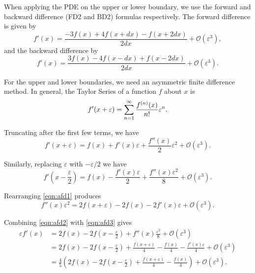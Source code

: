 When applying the PDE on the upper or lower boundary, we use the forward and backward difference (FD2 and BD2) formulas respectively.
The forward difference is given by
\begin{equation*}
    \label{eq:FD2}
    f'(x) = \frac{-3f(x)+4f(x+dx)-f(x+2dx)}{2dx} + \mathcal{O}(\varepsilon^3),
\end{equation*}
and the backward difference by
\begin{equation*}
    \label{eq:BD2}
    f'(x) = \frac{3f(x)-4f(x-dx)+f(x-2dx)}{2dx} + \mathcal{O}(\varepsilon^3).
\end{equation*}

For the upper and lower boundaries, we need an asymmetric finite difference
method.
In general, the Taylor Series of a function $f$ about $x$ is
\begin{equation*}
  f'(x+\varepsilon) = \sum_{n=1}^\infty \frac{f^{(n)}(x)}{n!} \varepsilon^n. \\
\end{equation*}

Truncating after the first few terms, we have
\begin{equation}
  \label{eqn:afd1}
  f'(x+\varepsilon)  = f(x) + f'(x)\varepsilon + \frac{f''(x)}{2}\varepsilon^2 + \mathcal{O}(\varepsilon^3).
\end{equation}

Similarly, replacing $\varepsilon$ with $-\varepsilon/2$ we have
\begin{equation}
  \label{eqn:afd2}
  f'(x-\frac{\varepsilon}{2}) = f(x) - \frac{f'(x)\varepsilon}{2} + \frac{f''(x)\varepsilon^2}{8} + \mathcal{O}(\varepsilon^3).
\end{equation}

Rearranging \eqref{eqn:afd1} produces
\begin{equation}
  \label{eqn:afd3}
  f''(x)\varepsilon^2 = 2f(x+\varepsilon) - 2f(x) - 2f'(x)\varepsilon + \mathcal{O}(\varepsilon^3).
\end{equation}

Combining \eqref{eqn:afd2} with \eqref{eqn:afd3} gives
\begin{align*}
  \varepsilon f'(x) &= 2f(x) - 2f(x-\frac{\varepsilon}{2}) + f''(x)\frac{\varepsilon^2}{8} + \mathcal{O}(\varepsilon^3) \\
                    &= 2f(x) - 2f(x-\frac{\varepsilon}{2}) + \frac{f(x+\varepsilon)}{4} - \frac{f(x)}{4} - \frac{f'(x)\varepsilon}{4} + \mathcal{O}(\varepsilon^3) \\
                    &= \frac{4}{5}\left( 2f(x)-2f(x-\frac{\varepsilon}{2}) + \frac{f(x+\varepsilon)}{4} - \frac{f(x)}{4} \right) + \mathcal{O}(\varepsilon^3).
\end{align*}

